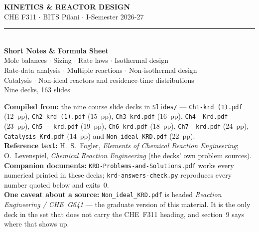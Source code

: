 \documentclass[10pt,a4paper]{article}
\newenvironment{daybox}{%
  \par\addvspace{4pt}\noindent\begin{lrbox}{\spboxa}%
  \begin{minipage}{\dimexpr\linewidth-12pt\relax}\small\color{notecol}%
}{\end{minipage}\end{lrbox}%
  \fcolorbox{boxframe}{white}{\usebox{\spboxa}}\par\addvspace{6pt}}
\providecommand{\textperiodcentered}{\ensuremath{\cdot}}
\begin{document}

\begin{center}
{\LARGE\bfseries\color{accent} KINETICS \& REACTOR DESIGN}\\[2pt]
{\color{accent2} CHE F311 \textperiodcentered{} BITS Pilani \textperiodcentered{} I-Semester 2026-27}\\[4pt]
{\color{rule}\rule{0.6\linewidth}{0.8pt}}\\[6pt]
{\Large\bfseries\color{accent} Short Notes \& Formula Sheet}\\[4pt]
{\color{accent2} Mole balances \textperiodcentered{} Sizing \textperiodcentered{} Rate laws \textperiodcentered{} Isothermal design\\
 Rate-data analysis \textperiodcentered{} Multiple reactions \textperiodcentered{} Non-isothermal design\\
 Catalysis \textperiodcentered{} Non-ideal reactors and residence-time distributions}\\[3pt]
{\footnotesize\color{notecol} Nine decks, 163 slides}
\end{center}

\vspace{2mm}
\begin{daybox}
\textbf{Compiled from:} the nine course slide decks in \texttt{Slides/} --- \texttt{Ch1-krd (1).pdf} (12~pp), \texttt{Ch2-krd (1).pdf} (15~pp), \texttt{Ch3-krd.pdf} (16~pp), \texttt{Ch4-\_Krd.pdf} (23~pp), \texttt{Ch5\_-\_krd.pdf} (19~pp), \texttt{Ch6\_krd.pdf} (18~pp), \texttt{Ch7-\_krd.pdf} (24~pp), \texttt{Catalysis\_Krd.pdf} (14~pp) and \texttt{Non\_ideal\_KRD.pdf} (22~pp).\\[2pt]
\textbf{Reference text:} H.~S.~Fogler, \emph{Elements of Chemical Reaction Engineering}; O.~Levenspiel, \emph{Chemical Reaction Engineering} (the decks' own problem sources).\\[2pt]
\textbf{Companion documents:} \texttt{KRD-Problems-and-Solutions.pdf} works every numerical printed in these decks; \texttt{krd-answers-check.py} reproduces every number quoted below and exits~0.\\[2pt]
\textbf{One caveat about a source:} \texttt{Non\_ideal\_KRD.pdf} is headed \emph{Reaction Engineering / CHE~G641} --- the graduate version of this material. It is the only deck in the set that does not carry the CHE~F311 heading, and section~9 says where that shows up.
\end{daybox}
\end{document}
